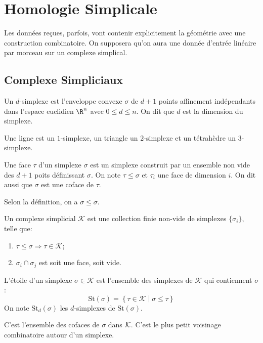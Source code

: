 \section{Homologie Simplicale}
Les données reçues, parfois, vont contenir explicitement la géométrie avec une construction combinatoire.
On supposera qu'on aura une donnée d'entrée linéaire par morceau sur un complexe simplical.

\subsection{Complexe Simpliciaux}
\begin{definition}
	Un $d$-simplexe est l'enveloppe convexe $\sigma$ de $d + 1$ points affinement indépendants dans l'espace euclidien $\R^{n}$ avec $0 \leq d \leq n$.
	On dit que $d$ est la dimension du simplexe.
\end{definition}

Une ligne est un $1$-simplexe, un triangle un $2$-simplexe et un tétrahèdre un $3$-simplexe.

\begin{definition}
	Une face $\tau$ d'un simplexe $\sigma$ est un simplexe construit par un ensemble non vide des $d + 1$ poits définissant $\sigma$.
	On note $\tau \leq \sigma$ et $\tau_{i}$ une face de dimension $i$.
	On dit aussi que $\sigma$ est une coface de $\tau$.
\end{definition}
Selon la définition, on a $\sigma \leq \sigma$.

\begin{definition}
	Un complexe simplicial $\mathcal{K}$ est une collection finie non-vide de simplexes $\{\sigma_{i}\}$, telle que:
	\begin{enumerate}
		\item $\tau \leq \sigma \Rightarrow \tau \in \mathcal{K}$;
		\item $\sigma_{i} \cap \sigma_{j}$ est soit une face, soit vide.
	\end{enumerate}
\end{definition}

\begin{definition}
	L'étoile d'un simplexe $\sigma \in \mathcal{K}$ est l'ensemble des simplexes de $\mathcal{K}$ qui contiennent $\sigma$:
	\begin{equation*}
		\mathrm{St}(\sigma) = \left\{\tau \in \mathcal{K} \middle| \sigma \leq \tau \right\}
	\end{equation*}
	On note $\mathrm{St}_{d}(\sigma)$ les $d$-simplexes de $\mathrm{St}(\sigma)$.
\end{definition}
C'est l'ensemble des cofaces de $\sigma$ dans $\mathcal{K}$. C'est le plus petit voisinage combinatoire autour d'un simplexe.

